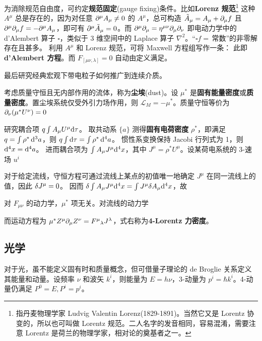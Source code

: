 为消除规范自由度，可约定\textbf{规范固定}(gauge fixing)条件。比如\textbf{Lorenz 规范}\footnote{指丹麦物理学家 Ludvig Valentin Lorenz(1829-1891)。当然它又是 Lorentz 协变的，所以也可叫做 Lorentz 规范。二人名字的发音相同，容易混淆，需要注意 Lorentz 是荷兰的物理学家，相对论的奠基者之一。}
这种 $A^\mu$ 总是存在的，因为对任意 $\partial^\mu A_\mu \ne 0$ 的 $A^\mu$，总可构造 $\tilde A_\mu = A_\mu + \partial_\mu f$ 且 $\partial^\mu\partial_\mu f=-\partial^\mu A_\mu $，即可有 $\partial^\mu \tilde A_\mu =0$。而 $\partial^\mu\partial_\mu=\eta^{\mu\nu}\partial_{\mu}\partial_{\nu}$ 即电动力学中的 d'Alembert 算子 $\square$，类似于 3 维空间中的 Laplace 算子 $\nabla^2$。“$\square f =$\,常数”的非零解存在且甚多。
利用 $A^\mu$ 和 Lorenz 规范，可将 Maxwell 方程组写作一条：
此即\textbf{d'Alembert 方程}。而 $F_{[\mu\nu,\lambda]}=0$ 自动由定义满足。

最后研究经典宏观下带电粒子如何推广到连续介质。

考虑质量守恒且无内部作用的流体，称为\textbf{尘埃}(dust)。设 $\mu^*$ 是\textbf{固有能量密度}或\textbf{质量密度}。置尘埃系统仅受外引力场作用，则 $\mathcal L_M=-\mu^*$。质量守恒等价为 $\partial_\nu(\mu^* U^\nu)=0$

研究耦合项 $q\int A_\mu U^\mu \dd\tau$。 
取共动系 $\{a\}$ 测得\textbf{固有电荷密度} $\rho^*$，即满足 $q=\int\rho^*\dd[3]{a}$，则 $q\int\dd\tau=\int\rho^*\dd[4]{a}$。
惯性系变换保持 Jacobi 行列式为 1，则 $\dd[4]x =\dd[4]{a}$。
进而耦合项为 $\int A_\mu J^\mu \dd[4]x$，其中 $J^\mu=\rho^*U^\mu$。设某荷电系统的 3-速场 $u^i$


对于给定流线，守恒⽅程可通过流线上某点的初值唯⼀地确定 $J^\mu$ 在同⼀流线上的值，因此 $\var J^\mu=0$。
因而 $\var\int A_\mu J^\mu \dd[4]x=\int J^\mu \delta A_\mu \dd[4]x$，故

对 $F_{\mu\nu}$ 的动力学，$\mu^*$ 项无关。对流线的动力学


而运动方程为 $\mu^* Z^\mu\partial_\mu Z^\nu=F^\mu{}_{\lambda}J^\lambda$，式右称为\textbf{4-Lorentz 力密度}。

\subsection{光学}

对于光，虽不能定义固有时和质量概念，但可借量子理论的 de Broglie 关系定义其能量和动量。设频率 $\nu$ 和波矢 $k^i$，则能量为 $E=h\nu$，3-动量为 $p^i = \hbar k^i$。4-动量仍满足 $P^0=E,P^i=p^i$。


